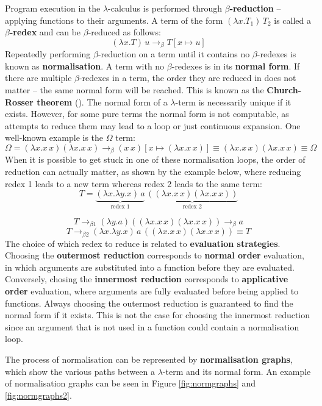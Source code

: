 \documentclass[11pt]{article}
\begin{document}
Program execution in the $\lambda$-calculus is performed through \textbf{$\beta$-reduction} -- applying functions to their arguments. A term of the form $(\lambda x. T_1) \, T_2$ is called a \textbf{$\beta$-redex} and can be $\beta$-reduced as follows:
%
$$(\lambda x. T) \, u \to_\beta T[x \mapsto u]$$
%
Repeatedly performing $\beta$-reduction on a term until it contains no $\beta$-redexes is known as \textbf{normalisation}. A term with no $\beta$-redexes is in its \textbf{normal form}. If there are multiple $\beta$-redexes in a term, the order they are reduced in does not matter -- the same normal form will be reached. This is known as the \textbf{Church-Rosser theorem} (\cite{churchrosser}). The normal form of a $\lambda$-term is necessarily unique if it exists. However, for some pure terms the normal form is not computable, as attempts to reduce them may lead to a loop or just continuous expansion. One well-known example is the $\Omega$ term:
%
$$ \Omega = (\lambda x. x \, x)(\lambda x. x \, x) \rightarrow_\beta (x \, x)[x \mapsto (\lambda x. x \, x)] \equiv (\lambda x. x \, x)(\lambda x. x \, x) \equiv \Omega $$
%
When it is possible to get stuck in one of these normalisation loops, the order of reduction can actually matter, as shown by the example below, where reducing redex 1 leads to a new term whereas redex 2 leads to the same term:
%
$$ T = \underbrace{(\lambda x. \lambda y. x) \, a}_\text{redex 1} \, \underbrace{((\lambda x. x \, x) (\lambda x. x \, x))}_\text{redex 2} $$

$$ T \rightarrow_{\beta1} (\lambda y. a)((\lambda x. x \, x)(\lambda x. x \, x)) \rightarrow_\beta a$$
%
$$ T \rightarrow_{\beta2} (\lambda x. \lambda y. x) \, a \, ((\lambda x. x \, x)(\lambda x. x \, x)) \equiv T$$
%
The choice of which redex to reduce is related to \textbf{evaluation strategies}. Choosing the \textbf{outermost reduction} corresponds to \textbf{normal order} evaluation, in which arguments are substituted into a function before they are evaluated. Conversely, chosing the \textbf{innermost reduction} corresponds to \textbf{applicative order} evaluation, where arguments are fully evaluated before being applied to functions. Always choosing the outermost reduction is guaranteed to find the normal form if it exists. This is not the case for choosing the innermost reduction since an argument that is not used in a function could contain a normalisation loop.

The process of normalisation can be represented by \textbf{normalisation graphs}, which show the various paths between a $\lambda$-term and its normal form. An example of normalisation graphs can be seen in Figure \ref{fig:normgraphs} and \ref{fig:normgraphs2}.
\end{document}
